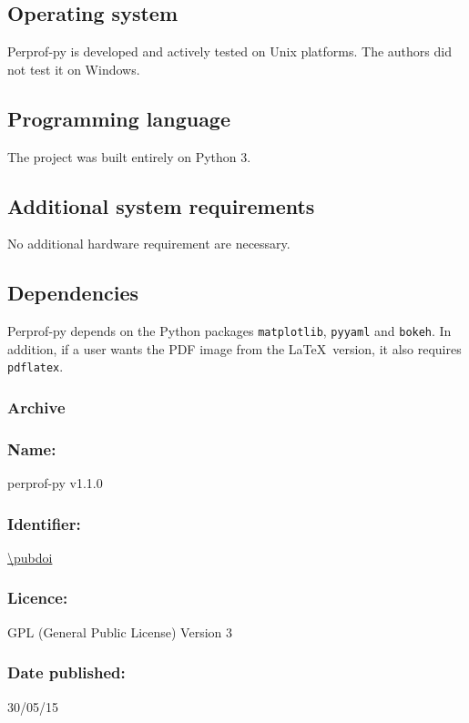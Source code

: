 \subsection*{Operating system}

    Perprof-py is developed and actively tested on Unix platforms.
    The authors did not test it on Windows.

\subsection*{Programming language}

    The project was built entirely on Python 3.

\subsection*{Additional system requirements}

    No additional hardware requirement are necessary.

\subsection*{Dependencies}

    Perprof-py depends on the Python packages \texttt{matplotlib}, \texttt{pyyaml} and \texttt{bokeh}.
    In addition, if a user wants the PDF image from the \LaTeX\
    version, it also requires \texttt{pdflatex}.

\subsubsection*{Archive}

    \subsubsection*{Name:} perprof-py v1.1.0

    \subsubsection*{Identifier:} \url{\pubdoi}

    \subsubsection*{Licence:} GPL (General Public License) Version 3

    \subsubsection*{Date published:} 30/05/15

